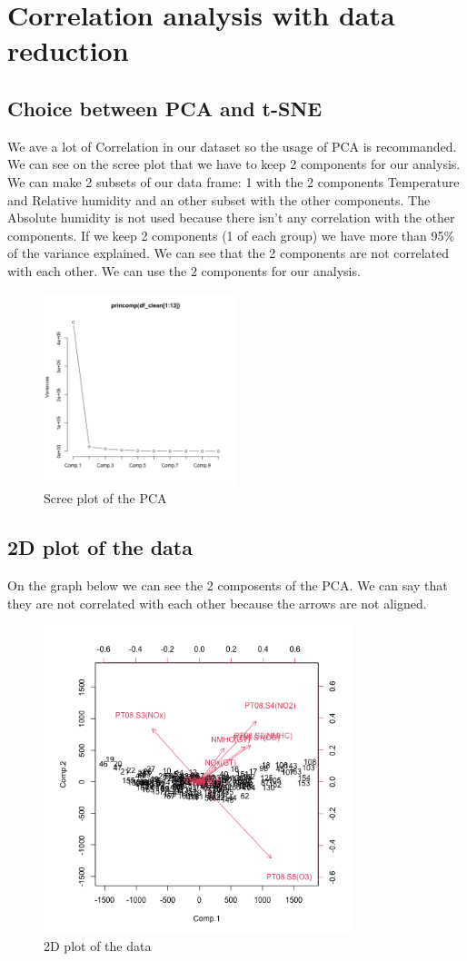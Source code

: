\section{Correlation analysis with data reduction}

\subsection{Choice between PCA and t-SNE}
We ave a lot of Correlation in our dataset so the usage of PCA is recommanded. We can see on the scree plot that we have to keep 2 components for our analysis.
We can make 2 subsets of our data frame: 1 with the 2 components Temperature and Relative humidity and an other subset with the other components. The Absolute humidity is not used because there isn't any correlation with the other components.
If we keep 2 components (1 of each group) we have more than 95\% of the variance explained. We can see that the 2 components are not correlated with each other. We can use the 2 components for our analysis.
\begin{figure}[h]
\centering
\includegraphics[width=0.5\textwidth]{figs/scree_plot.png}
\caption{Scree plot of the PCA}
\label{fig:scree_plot}
\end{figure}

\subsection{2D plot of the data}

On the graph below we can see the 2 composents of the PCA. We can say that they are not correlated with each other because the arrows are not aligned.
\begin{figure}[H]
\centering
\includegraphics[width=0.8\textwidth]{figs/biplot.png}
\caption{2D plot of the data}
\label{fig:2d_plot}
\end{figure}
